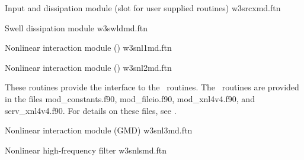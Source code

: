 \noindent
Input and dissipation module (slot for user supplied routines) \hfill {\file
w3srcxmd.ftn}

\begin{flisti}
\end{flisti}

\noindent
Swell dissipation module \hfill {\file w3swldmd.ftn}

\begin{flist}
\end{flist}

\noindent
Nonlinear interaction module (\dia) \hfill {\file w3snl1md.ftn}

\begin{flisti}
\end{flisti}

\noindent
Nonlinear interaction module (\xnl) \hfill {\file w3snl2md.ftn}

\begin{flisti}
\end{flisti}
These routines provide the interface to the \xnl\ routines. The \xnl\ routines
are provided in the files {\file mod\_constants.f90}, {\file mod\_fileio.f90},
{\file mod\_xnl4v4.f90}, and {\file serv\_xnl4v4.f90}. For details on these
files, see \cite{rep:vVl02b}.

\vspace{\baselineskip}
\noindent
Nonlinear interaction module (GMD) \hfill {\file w3snl3md.ftn}

\begin{flisti}
\end{flisti}

\vspace{\baselineskip}
\noindent
Nonlinear high-frequency filter \hfill {\file w3snlsmd.ftn}

\begin{flisti}
\end{flisti}

